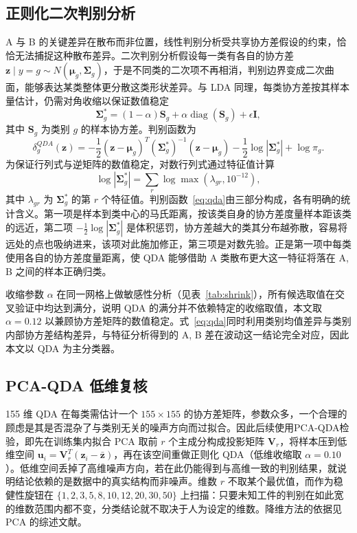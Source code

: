 \documentclass[12pt,a4paper]{article}
\newcommand{\upcite}[1]{\cite{#1}}
\begin{document}
\subsection{正则化二次判别分析}

A 与 B 的关键差异在散布而非位置，线性判别分析受共享协方差假设的约束，恰恰无法捕捉这种散布差异。二次判别分析假设每一类有各自的协方差 $\mathbf{z}\mid y=g\sim N(\boldsymbol{\mu}_g,\boldsymbol{\Sigma}_g)$，于是不同类的二次项不再相消，判别边界变成二次曲面，能够表达某类整体更分散这类形状差异。与 LDA 同理，每类协方差按其样本量估计，仍需对角收缩以保证数值稳定
\begin{equation}
\boldsymbol{\Sigma}_g^{*}=(1-\alpha)\mathbf{S}_g+\alpha\operatorname{diag}(\mathbf{S}_g)+\epsilon\mathbf{I},
\end{equation}
其中 $\mathbf{S}_g$ 为类别 $g$ 的样本协方差。判别函数为
\begin{equation}
\delta_g^{QDA}(\mathbf{z})=-\frac{1}{2}(\mathbf{z}-\boldsymbol{\mu}_g)^{T}(\boldsymbol{\Sigma}_g^{*})^{-1}(\mathbf{z}-\boldsymbol{\mu}_g)
-\frac{1}{2}\log|\boldsymbol{\Sigma}_g^{*}|+\log\pi_g.
\label{eq:qda}
\end{equation}
为保证行列式与逆矩阵的数值稳定，对数行列式通过特征值计算
\begin{equation}
\log|\boldsymbol{\Sigma}_g^{*}|=\sum_{r}\log\max(\lambda_{gr},10^{-12}),
\end{equation}
其中 $\lambda_{gr}$ 为 $\boldsymbol{\Sigma}_g^{*}$ 的第 $r$ 个特征值。判别函数~\eqref{eq:qda}由三部分构成，各有明确的统计含义。第一项是样本到类中心的马氏距离，按该类自身的协方差度量样本距该类的远近，第二项 $-\frac{1}{2}\log|\boldsymbol{\Sigma}_g^{*}|$ 是体积惩罚，协方差越大的类其分布越弥散，容易将远处的点也吸纳进来，该项对此施加修正，第三项是对数先验。正是第一项中每类使用各自的协方差度量距离，使 QDA 能够借助 A 类散布更大这一特征将落在 A, B 之间的样本正确归类。

收缩参数 $\alpha$ 在同一网格上做敏感性分析（见表~\ref{tab:shrink}），所有候选取值在交叉验证中均达到满分，说明 QDA 的满分并不依赖特定的收缩取值，本文取 $\alpha=0.12$ 以兼顾协方差矩阵的数值稳定。式~\eqref{eq:qda}同时利用类别均值差异与类别内部协方差结构差异，与特征分析得到的 A, B 差在波动这一结论完全对应，因此本文以 QDA 为主分类器。

\subsection{PCA-QDA 低维复核}

155 维 QDA 在每类需估计一个 $155\times155$ 的协方差矩阵，参数众多，一个合理的顾虑是其是否混杂了与类别无关的噪声方向而过拟合。因此后续使用PCA-QDA检验，即先在训练集内拟合 PCA 取前 $r$ 个主成分构成投影矩阵 $\mathbf{V}_r$，将样本压到低维空间 $\mathbf{u}_i=\mathbf{V}_r^{T}(\mathbf{z}_i-\bar{\mathbf{z}})$，再在该空间重做正则化 QDA（低维收缩取 $\alpha=0.10$）。低维空间丢掉了高维噪声方向，若在此仍能得到与高维一致的判别结果，就说明结论依赖的是数据中的真实结构而非噪声。维数 $r$ 不取某个最优值，而作为稳健性旋钮在 $\{1,2,3,5,8,10,12,20,30,50\}$ 上扫描：只要未知工件的判别在如此宽的维数范围内都不变，分类结论就不取决于人为设定的维数。降维方法的依据见 PCA 的综述文献\upcite{jolliffe2016}。
\end{document}
